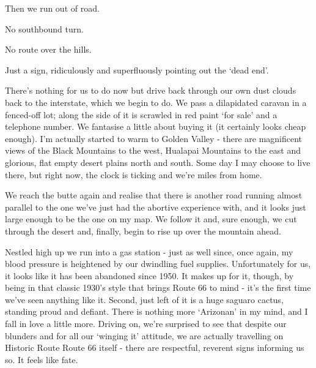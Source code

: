 \documentclass[a5paper,titlepage,11pt]{book}
\begin{document}
Then we run out of road.

No southbound turn.

No route over the hills.

Just a sign, ridiculously and superfluously pointing out the `dead end'.

There's nothing for us to do now but drive back through our own dust clouds back to the interstate, which we begin to do.  We pass a dilapidated caravan in a fenced-off lot; along the side of it is scrawled in red paint `for sale' and a telephone number.  We fantasise a little about buying it (it certainly looks cheap enough).  I'm actually started to warm to Golden Valley - there are magnificent views of the Black Mountains to the west, Hualapai Mountains to the east and glorious, flat empty desert plains north and south.  Some day I may choose to live there, but right now, the clock is ticking and we're miles from home.


We reach the butte again and realise that there is another road running almost parallel to the one we've just had the abortive experience with, and it looks just large enough to be the one on my map.  We follow it and, sure enough, we cut through the desert and, finally, begin to rise up over the mountain ahead.

Nestled high up we run into a gas station - just as well since, once again, my blood pressure is heightened by our dwindling fuel supplies.  Unfortunately for us, it looks like it has been abandoned since 1950.  It makes up for it, though, by being in that classic 1930's style that brings Route 66 to mind - it's the first time we've seen anything like it.  Second, just left of it is a huge saguaro cactus, standing proud and defiant.  There is nothing more `Arizonan' in my mind, and I fall in love a little more.  Driving on, we're surprised to see that despite our blunders and for all our `winging it' attitude, we are actually travelling on Historic Route Route 66 itself - there are respectful, reverent signs informing us so.  It feels like fate.
\end{document}
